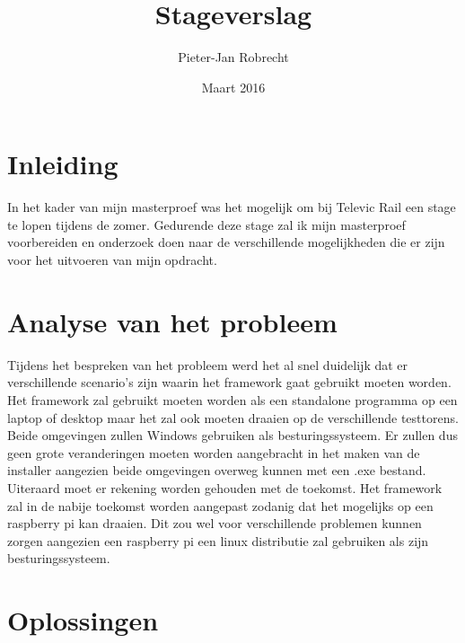 \documentclass{article}
\title{Stageverslag}
\author{\mbox{Pieter-Jan} Robrecht}
\date{Maart 2016}
\begin{document}


\clearpage
\setcounter{page}{1}

\tableofcontents
\clearpage

\section{Inleiding}
In het kader van mijn masterproef was het mogelijk om bij Televic Rail een stage te lopen tijdens de zomer. Gedurende deze stage zal ik mijn masterproef voorbereiden en onderzoek doen naar de verschillende mogelijkheden die er zijn voor het uitvoeren van mijn opdracht. 

\section{Analyse van het probleem}
Tijdens het bespreken van het probleem werd het al snel duidelijk dat er verschillende scenario's zijn waarin het framework gaat gebruikt moeten worden. Het framework zal gebruikt moeten worden als een standalone programma op een laptop of desktop maar het zal ook moeten draaien op de verschillende testtorens. Beide omgevingen zullen Windows gebruiken als besturingssysteem. Er zullen dus geen grote veranderingen moeten worden aangebracht in het maken van de installer aangezien beide omgevingen overweg kunnen met een .exe bestand. Uiteraard moet er rekening worden gehouden met de toekomst. Het framework zal in de nabije toekomst worden aangepast zodanig dat het mogelijks op een raspberry pi kan draaien. Dit zou wel voor verschillende problemen kunnen zorgen aangezien een raspberry pi een linux distributie zal gebruiken als zijn besturingssysteem. 

\section{Oplossingen}
\end{document}
